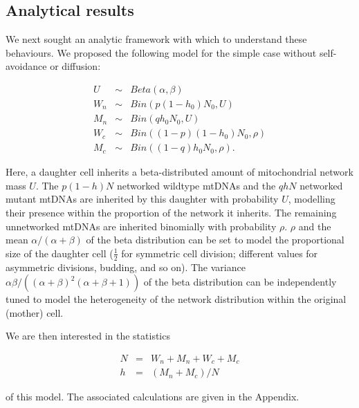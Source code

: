 \documentclass{article}
\begin{document}
\subsection*{Analytical results}
We next sought an analytic framework with which to understand these behaviours. We proposed the following model for the simple case without self-avoidance or diffusion:

\begin{eqnarray}
  U & \sim & Beta(\alpha, \beta) \\
  W_n & \sim & Bin(p(1-h_0)N_0, U) \\
  M_n & \sim & Bin(qh_0 N_0, U) \\
  W_c & \sim & Bin((1-p)(1-h_0)N_0, \rho) \\
  M_c & \sim & Bin((1-q)h_0 N_0, \rho).
\end{eqnarray}

Here, a daughter cell inherits a beta-distributed amount of mitochondrial network mass $U$. The $p(1-h)N$ networked wildtype mtDNAs and the $qhN$ networked mutant mtDNAs are inherited by this daughter with probability $U$, modelling their presence within the proportion of the network it inherits. The remaining unnetworked mtDNAs are inherited binomially with probability $\rho$. $\rho$ and the mean $\alpha/(\alpha+\beta)$ of the beta distribution can be set to model the proportional size of the daughter cell ($\frac{1}{2}$ for symmetric cell division; different values for asymmetric divisions, budding, and so on). The variance $\alpha \beta / ((\alpha+ \beta)^2 (\alpha + \beta + 1))$ of the beta distribution can be independently tuned to model the heterogeneity of the network distribution within the original (mother) cell.

We are then interested in the statistics

\begin{eqnarray}
  N & = & W_n + M_n + W_c + M_c \\
  h & = & (M_n + M_c) / N
\end{eqnarray}

of this model. The associated calculations are given in the Appendix. 
\end{document}
